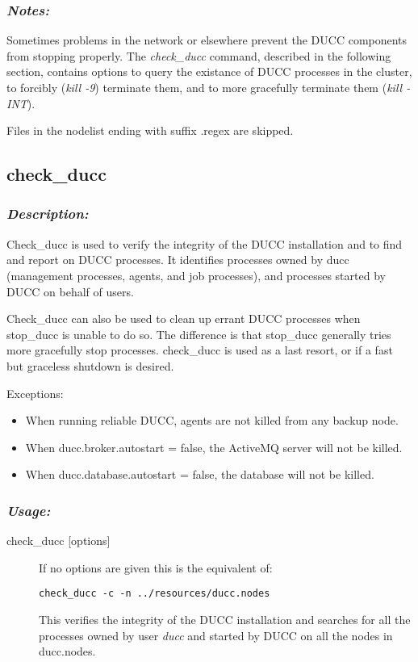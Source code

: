    \subsubsection{{\em Notes:}}
   Sometimes problems in the network or elsewhere prevent the DUCC components from stopping properly.  The
   {\em check\_ducc} command, described in the following section, contains options to query the
   existance of DUCC processes in the cluster, to forcibly ({\em kill -9}) terminate them, and to
   more gracefully terminate them ({\em kill -INT}).
          
      Files in the nodelist ending with suffix .regex are skipped.

\subsection{check\_ducc}
\label{subsec:admin.check-ducc}
    \subsubsection{{\em Description:}}

    Check\_ducc is used to verify the integrity of the DUCC installation and to find and report on
    DUCC processes. It identifies processes owned by ducc (management processes, agents,
    and job processes), and processes started by DUCC on behalf of users.
    
    Check\_ducc can also be used to clean up errant DUCC processes when stop\_ducc is unable 
    to do so. The difference is that stop\_ducc generally tries more gracefully stop processes. 
    check\_ducc is used as a last resort, or if a fast but graceless shutdown is desired. 
    
    Exceptions:
    \begin{itemize}
      \item When running reliable DUCC, agents are not killed from any backup node.
      \item When ducc.broker.autostart = false, the ActiveMQ server will not be killed.
      \item When ducc.database.autostart = false, the database will not be killed.
    \end{itemize}
    
    \subsubsection{\em{Usage: }}

        \begin{description} 
          \item[check\_ducc {[options]}]
              If no options are given this is the equivalent of: 
\begin{verbatim}
check_ducc -c -n ../resources/ducc.nodes 
\end{verbatim}
              
              This verifies the integrity of the DUCC installation and searches for all the
              processes owned by user {\em ducc} and started by DUCC on all the nodes in ducc.nodes.
        \end{description}
            
